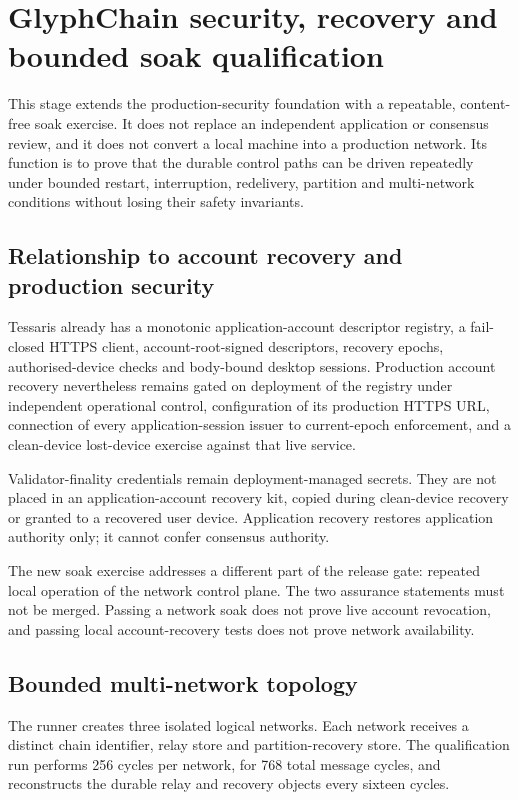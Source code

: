 \section{GlyphChain security, recovery and bounded soak qualification}
\label{sec:glyphchain-security-recovery-soak}

This stage extends the production-security foundation with a repeatable,
content-free soak exercise.  It does not replace an independent application or
consensus review, and it does not convert a local machine into a production
network.  Its function is to prove that the durable control paths can be driven
repeatedly under bounded restart, interruption, redelivery, partition and
multi-network conditions without losing their safety invariants.

\subsection{Relationship to account recovery and production security}

Tessaris already has a monotonic application-account descriptor registry, a
fail-closed HTTPS client, account-root-signed descriptors, recovery epochs,
authorised-device checks and body-bound desktop sessions.  Production account
recovery nevertheless remains gated on deployment of the registry under
independent operational control, configuration of its production HTTPS URL,
connection of every application-session issuer to current-epoch enforcement,
and a clean-device lost-device exercise against that live service.

Validator-finality credentials remain deployment-managed secrets.  They are
not placed in an application-account recovery kit, copied during clean-device
recovery or granted to a recovered user device.  Application recovery restores
application authority only; it cannot confer consensus authority.

The new soak exercise addresses a different part of the release gate: repeated
local operation of the network control plane.  The two assurance statements
must not be merged.  Passing a network soak does not prove live account
revocation, and passing local account-recovery tests does not prove network
availability.

\subsection{Bounded multi-network topology}

The runner creates three isolated logical networks.  Each network receives a
distinct chain identifier, relay store and partition-recovery store.  The
qualification run performs 256 cycles per network, for 768 total message
cycles, and reconstructs the durable relay and recovery objects every sixteen
cycles.

